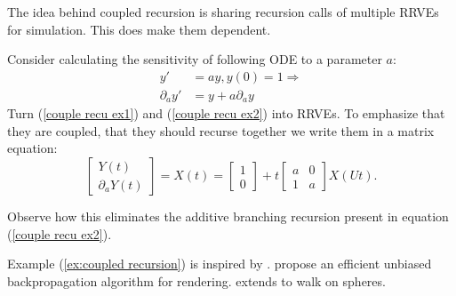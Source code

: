 \documentclass[a4paper,12pt]{article}
\begin{document}
\begin{technique}
    The idea behind coupled recursion is sharing recursion calls of
    multiple RRVEs for simulation. This does make them dependent.
\end{technique}

\begin{example} \label{ex:coupled recursion}
    Consider calculating the
    sensitivity of following ODE to a
    parameter $a$:
    \begin{align}
        y'             & =ay,y(0)=1 \Rightarrow \label{couple recu ex1} \\
        \partial_{a}y' & = y + a \partial_{a}y \label{couple recu ex2}
    \end{align}
    Turn (\ref{couple recu ex1}) and (\ref{couple recu ex2}) into RRVEs.
    To emphasize that they are coupled, that they should
    recurse together we write them in a matrix equation:
    \begin{equation} \label{coupled mat}
        \begin{bmatrix}
            Y(t) \\
            \partial_{a}Y(t)
        \end{bmatrix}=
        X(t)=
        \begin{bmatrix}
            1 \\
            0
        \end{bmatrix}+
        t \begin{bmatrix}
            a & 0 \\
            1 & a
        \end{bmatrix}
        X(Ut).
    \end{equation}

    Observe how this eliminates the additive branching recursion
    present in equation (\ref{couple recu ex2}).

\end{example}

\begin{pythonn} 
\end{pythonn}

\begin{related}
    Example (\ref{ex:coupled recursion}) is inspired by \cite{vicini_path_2021}.
    \cite{vicini_path_2021} propose an efficient unbiased backpropagation
    algorithm for rendering.
    \cite{yilmazer_solving_2022} extends \cite{vicini_path_2021} to walk on spheres.
\end{related}
\end{document}
